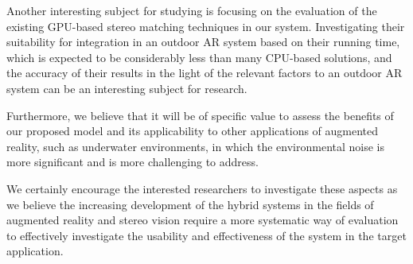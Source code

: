 Another interesting subject for studying is focusing on the evaluation of the existing GPU-based stereo matching techniques in our system.
Investigating their suitability for integration in an outdoor AR system based on their running time, which is expected to be considerably less 
than many CPU-based solutions, 
and the accuracy of their results in the light of the relevant factors to an outdoor AR system can be an interesting subject for research.

Furthermore, we believe that it will be of specific value to
assess the benefits of our proposed model and its applicability to other applications of augmented reality, such as underwater environments, in which the environmental 
noise is more significant and is more challenging to address. 

We certainly encourage the 
interested researchers to investigate these aspects as we believe the increasing development of the hybrid systems in the fields of augmented reality and stereo vision 
require a more systematic way of evaluation to effectively investigate the usability and effectiveness of the system in the target application.



